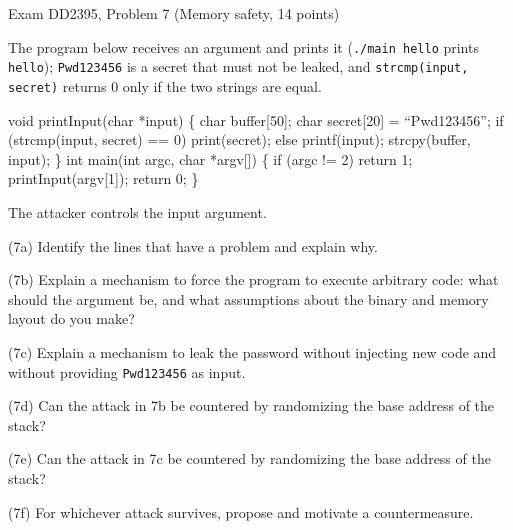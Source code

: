 \documentclass[12pt, a4paper]{article}
\begin{document}
\begin{practicebox}{Exam DD2395, Problem 7 (Memory safety, 14 points)}
\begin{problembox}
The program below receives an argument and prints it (\texttt{./main hello} prints \texttt{hello}); \texttt{Pwd123456} is a secret that must not be leaked, and \texttt{strcmp(input, secret)} returns 0 only if the two strings are equal. 
\begin{codebox}
void printInput(char *input) \{ char buffer[50];
char secret[20] = ``Pwd123456'';
if (strcmp(input, secret) == 0) print(secret);
else printf(input);
strcpy(buffer, input);
\} int main(int argc, char *argv[]) \{ if (argc != 2) return 1;
printInput(argv[1]);
return 0;
\}
\end{codebox}
 The attacker controls the input argument.

(7a) Identify the lines that have a problem and explain why.

(7b) Explain a mechanism to force the program to execute arbitrary code: what should the argument be, and what assumptions about the binary and memory layout do you make?

(7c) Explain a mechanism to leak the password without injecting new code and without providing \texttt{Pwd123456} as input.

(7d) Can the attack in 7b be countered by randomizing the base address of the stack?

(7e) Can the attack in 7c be countered by randomizing the base address of the stack?

(7f) For whichever attack survives, propose and motivate a countermeasure.
\end{problembox}


\end{practicebox}
\end{document}
